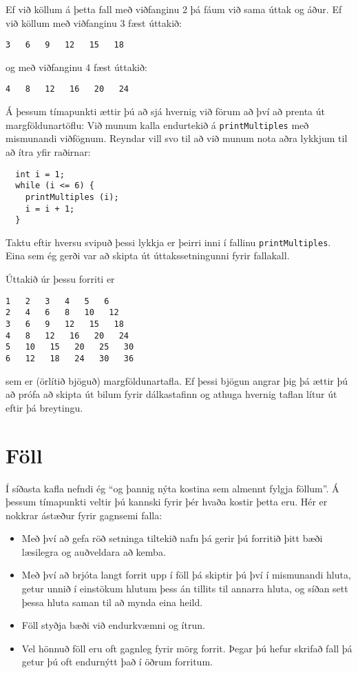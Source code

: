 Ef við köllum á þetta fall með viðfanginu 2 þá fáum við sama úttak og áður.
Ef við köllum með viðfanginu 3 fæst úttakið: 

\begin{verbatim}
3   6   9   12   15   18
\end{verbatim}
%
og með viðfanginu 4 fæst úttakið:

\begin{verbatim}
4   8   12   16   20   24 
\end{verbatim}
%
Á þessum tímapunkti ættir þú að sjá hvernig við förum að því að prenta út margföldunartöflu:
Við munum kalla endurtekið á {\tt printMultiples} með mismunandi viðfögnum.
Reyndar vill svo til að við munum nota aðra lykkjum til að ítra yfir raðirnar:

\begin{verbatim}
  int i = 1;
  while (i <= 6) {
    printMultiples (i);
    i = i + 1;
  }    
\end{verbatim}
%
Taktu eftir hversu svipuð þessi lykkja er þeirri inni í fallinu {\tt printMultiples}.
Eina sem ég gerði var að skipta út úttakssetningunni fyrir fallakall.

Úttakið úr þessu forriti er

\begin{verbatim}
1   2   3   4   5   6   
2   4   6   8   10   12   
3   6   9   12   15   18   
4   8   12   16   20   24   
5   10   15   20   25   30   
6   12   18   24   30   36   
\end{verbatim}
%
sem er (örlítið bjöguð) margföldunartafla.
Ef þessi bjögun angrar þig þá ættir þú að prófa að skipta út bilum fyrir dálkastafinn og athuga hvernig taflan lítur út eftir þá breytingu.

\section{Föll}

Í síðasta kafla nefndi ég ``og þannig nýta kostina sem almennt fylgja föllum''.
Á þessum tímapunkti veltir þú kannski fyrir þér hvaða kostir þetta eru. 
Hér er nokkrar ástæður fyrir gagnsemi falla:

\begin{itemize}

\item Með því að gefa röð setninga tiltekið nafn þá gerir þú forritið þitt bæði læsilegra og auðveldara að kemba.

\item Með því að brjóta langt forrit upp í föll þá skiptir þú því í mismunandi hluta, getur unnið í einstökum hlutum þess án tillits til annarra hluta,
og síðan sett þessa hluta saman til að mynda eina heild.

\item Föll styðja bæði við endurkvæmni og ítrun.

\item Vel hönnuð föll eru oft gagnleg fyrir mörg forrit. Þegar þú hefur skrifað fall þá getur þú oft endurnýtt það í öðrum forritum.

\end{itemize}

